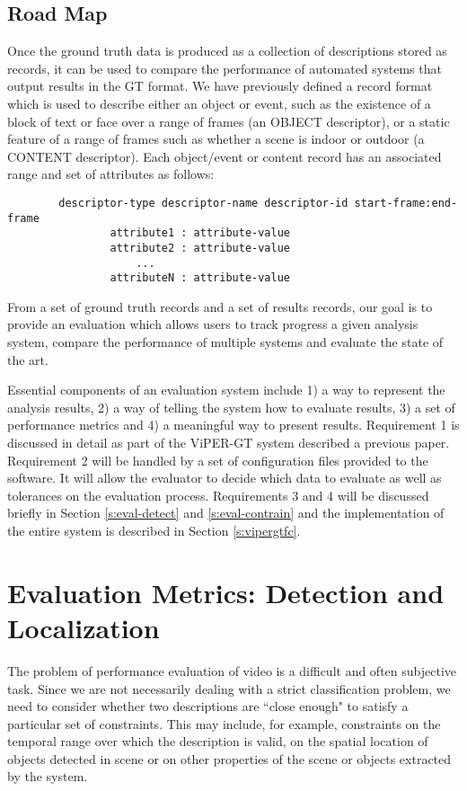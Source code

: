 \subsection{Road Map}
Once the ground truth data is produced as a collection of descriptions
stored as records, it can be used to compare the performance of
automated systems that output results in the GT format.  We have
previously defined a record format which is used to describe either an
object or event, such as the existence of a block of text or face over
a range of frames (an OBJECT descriptor), or a static feature of a
range of frames such as whether a scene is indoor or outdoor (a CONTENT
descriptor).  Each object/event or content record has an associated
range and set of attributes as follows:

\begin{verbatim}
        descriptor-type descriptor-name descriptor-id start-frame:end-frame
                attribute1 : attribute-value
                attribute2 : attribute-value
                    ...
                attributeN : attribute-value
\end{verbatim}

From a set of ground truth records and a set of results records, our
goal is to provide an evaluation which allows users to track progress
a given analysis system, compare the performance of multiple systems
and evaluate the state of the art.

Essential components of an evaluation system include 1) a way to
represent the analysis results, 2) a way of telling the system how to
evaluate results, 3) a set of performance metrics and 4) a meaningful
way to present results.  Requirement 1 is discussed in detail as part
of the ViPER-GT system described a previous paper.  Requirement 2
will be handled by a set of configuration files provided to the
software.  It will allow the evaluator to decide which data to
evaluate as well as tolerances on the evaluation process.
Requirements 3 and 4 will be discussed briefly in Section
\ref{s:eval-detect} and \ref{s:eval-contrain} and the implementation
of the entire system is described in Section \ref{s:vipergtfc}.

\section{Evaluation Metrics: Detection and  Localization}
\label{s:eval}

The problem of performance evaluation of video is a difficult and
often subjective task.  Since we are not necessarily dealing with a
strict classification problem, we need to consider whether two
descriptions are ``close enough" to satisfy a particular set of
constraints.  This may include, for example, constraints on the
temporal range over which the description is valid, on the spatial
location of objects detected in scene or on other properties of the
scene or objects extracted by the system.


